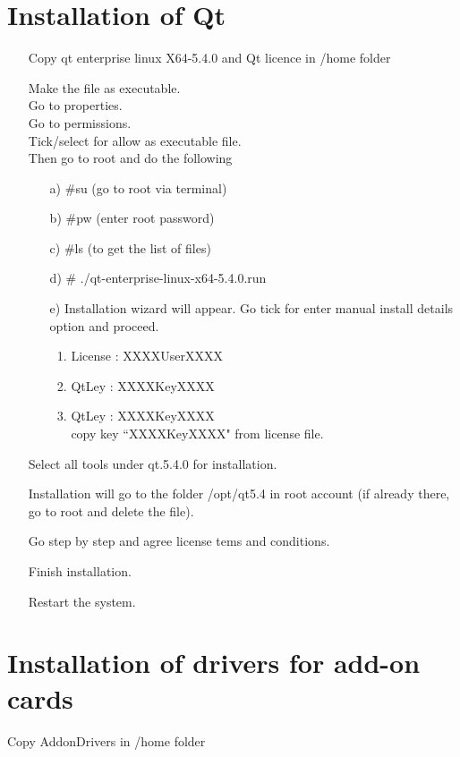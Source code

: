 \section{Installation of Qt}
\begin{enumerate}
	\item [\textbullet] Copy qt enterprise linux X64-5.4.0 and Qt licence in /home folder
	\item [\textbullet] Make the file as executable.\\ Go to properties.\\
	Go to permissions.\\
	Tick/select for allow as executable file. \\
	Then go to root and do the following
		\begin{enumerate}
			\item [a)] $\#$su  (go to root via terminal)
			\item [b)] $\#$pw (enter root password) 
			\item [c)] $\#$ls (to get the list of files)
			\item [d)] $\#$ ./qt-enterprise-linux-x64-5.4.0.run 
			\item [e)] Installation wizard will appear. Go tick for enter manual install details option and proceed.
				\begin{enumerate}
					\item License : XXXXUserXXXX
					\item QtLey	: XXXXKeyXXXX
					\item QtLey	: XXXXKeyXXXX \\
					copy key ``XXXXKeyXXXX" from license file.
				\end{enumerate}
		\end{enumerate}
	\item [\textbullet] Select all tools under qt.5.4.0 for installation.
	\item [\textbullet] Installation will go to the folder /opt/qt5.4 in root account (if already there, go to root and delete the file).
	\item [\textbullet] Go step by step and agree license tems and conditions.
	\item [\textbullet] Finish installation.
	\item [\textbullet] Restart the system.
\end{enumerate}

\section{Installation of drivers for add-on cards}
Copy AddonDrivers in /home folder

